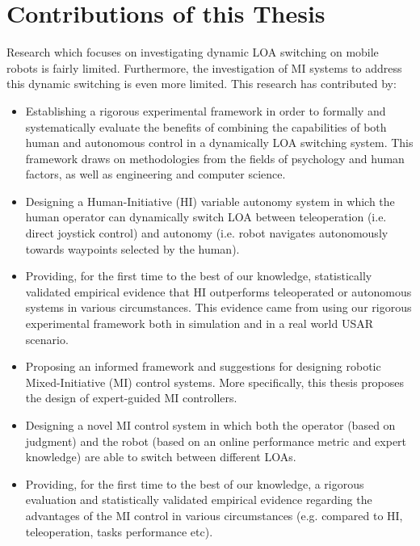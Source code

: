 \documentclass[a4paper,12pt,oneside,openright]{bhamthesis}
\begin{document}
\section{Contributions of this Thesis}
Research which focuses on investigating dynamic LOA switching on mobile robots is fairly limited. Furthermore, the investigation of MI systems to address this dynamic switching is even more limited. This research has contributed by:

\begin{itemize}

	\item Establishing a rigorous experimental framework in order to formally and systematically evaluate the benefits of combining the capabilities of both human and autonomous control in a dynamically LOA switching system. This framework draws on methodologies from the fields of psychology and human factors, as well as engineering and computer science.
	
	\item Designing a Human-Initiative (HI) variable autonomy system in which the human operator can dynamically switch LOA between teleoperation (i.e. direct joystick control) and autonomy (i.e. robot navigates autonomously towards waypoints selected by the human).
	
	\item Providing, for the first time to the best of our knowledge, statistically validated empirical evidence that HI outperforms teleoperated or autonomous systems in various circumstances. This evidence came from using our rigorous experimental framework both in simulation and in a real world USAR scenario.
    
    \item Proposing an informed framework and suggestions for designing robotic Mixed-Initiative (MI) control systems. More specifically, this thesis proposes the design of expert-guided MI controllers.
    
	\item Designing a novel MI control system in which both the operator (based on judgment) and the robot (based on an online performance metric and expert knowledge) are able to switch between different LOAs.
	
	\item Providing, for the first time to the best of our knowledge, a rigorous evaluation and statistically validated empirical evidence regarding the advantages of the MI control in various circumstances (e.g. compared to HI, teleoperation, tasks performance etc).
	

\end{itemize}
\end{document}
